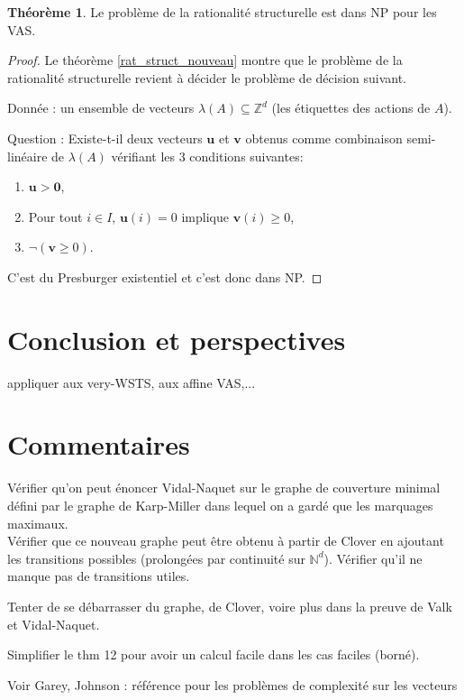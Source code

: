 \documentclass[a4paper,final]{article}
\theoremstyle{definition}
\newtheorem{Theorem}{Théorème}
\let\geq\geqslant
\newcommand{\N}{\ensuremath{\mathbb{N}}}
\newcommand{\Z}{\ensuremath{\mathbb{Z}}}
\newcommand{\vect}[1]{\ensuremath{\mathbf{#1}}}
\begin{document}
\begin{Theorem}\label{NP conf_struct_rat}
Le  problème de la rationalité structurelle est dans NP pour les VAS.
\end{Theorem}

\begin{proof}
Le théorème \ref{rat_struct_nouveau} montre que le problème de la rationalité structurelle revient à décider le problème de décision suivant.

Donnée : un ensemble de vecteurs $\lambda(A) \subseteq \Z^d$ (les étiquettes des actions de $A$).

Question : Existe-t-il deux vecteurs $\vect{u}$ et $\vect{v}$ obtenus comme combinaison semi-linéaire de $\lambda(A)$ vérifiant les 3 conditions suivantes:
\begin{enumerate}
    \item $\vect{u} > \vect{0}$,
    \item Pour tout $i \in I$, $\vect{u}(i)=0$ implique $\vect{v}(i) \geq 0$,
    \item  $\lnot(\vect{v} \geq 0)$.
\end{enumerate}
C'est du Presburger existentiel et c'est donc dans NP.
\end{proof}

\section{Conclusion et perspectives}

appliquer aux very-WSTS, aux affine VAS,...

\section{Commentaires}
Vérifier qu'on peut énoncer Vidal-Naquet sur le graphe de couverture minimal défini par le graphe de Karp-Miller dans lequel on a gardé que les marquages maximaux.\\
Vérifier que ce nouveau graphe peut être obtenu à partir de Clover en ajoutant les transitions possibles (prolongées par continuité sur $\N^d$). Vérifier qu'il ne manque pas de transitions utiles.

Tenter de se débarrasser du graphe, de Clover, voire plus dans la preuve de Valk et Vidal-Naquet.

Simplifier le thm 12 pour avoir un calcul facile dans les cas faciles (borné).

Voir Garey, Johnson : référence pour les problèmes de complexité sur les vecteurs
\end{document}
